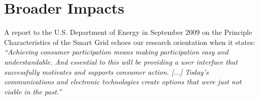 
\section*{Broader Impacts}
\label{sec:merit}



A report to the U.S. Department of Energy in September 2009 on the
Principle Characteristics of the Smart Grid echoes our research orientation
when it states: {\em ``Achieving consumer participation means
  making participation easy and understandable.  And essential to this will
  be providing a user interface that successfully motivates and supports
  consumer action. [...] Today's communications and electronic technologies
  create options that were just not viable in the past.''}
\cite{NETL:EnablesActiveParticipation}

